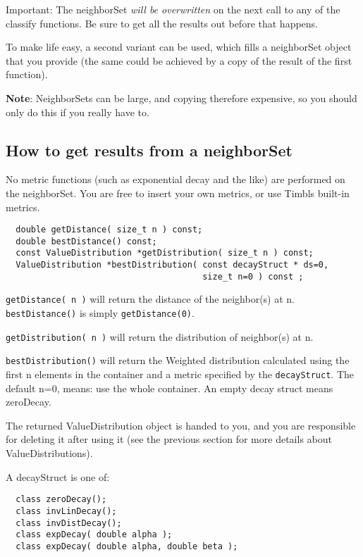 \documentclass{report}
\begin{document}
Important:  The neighborSet {\em will be overwritten}\/ on the next
call to any of the classify functions. Be sure to get all the
results out before that happens.

To make life easy, a second variant can be used, which fills a
neighborSet object that you provide (the same could be achieved by a
copy of the result of the first function). 

{\bf Note}: NeighborSets can be large, and copying therefore
expensive, so you should only do this if you really have to.

\subsection{How to get results from a neighborSet}

No metric functions (such as exponential decay and the like) are
performed on the neighborSet. You are free to insert your own metrics, or
use Timbls built-in metrics.

\begin{footnotesize}
\begin{verbatim}
  double getDistance( size_t n ) const;
  double bestDistance() const;
  const ValueDistribution *getDistribution( size_t n ) const;
  ValueDistribution *bestDistribution( const decayStruct * ds=0,
                                       size_t n=0 ) const ;
\end{verbatim}
\end{footnotesize}

{\tt getDistance( n )} will return the distance of the neighbor(s) at n.
{\tt bestDistance()} is simply {\tt getDistance(0)}.

{\tt getDistribution( n )} will return the distribution of neighbor(s) at
n.

{\tt bestDistribution()} will return the Weighted distribution
calculated using the first n elements in the container and a metric
specified by the {\tt decayStruct}.  The default n=0, means: use the
whole container. An empty decay struct means zeroDecay.

The returned ValueDistribution object is handed to you, and you are
responsible for deleting it after using it (see the previous section
for more details about ValueDistributions).

A decayStruct is one of:

\begin{footnotesize}
\begin{verbatim}
  class zeroDecay();
  class invLinDecay();
  class invDistDecay();
  class expDecay( double alpha );
  class expDecay( double alpha, double beta );
\end{verbatim}
\end{footnotesize}
 
\end{document}
